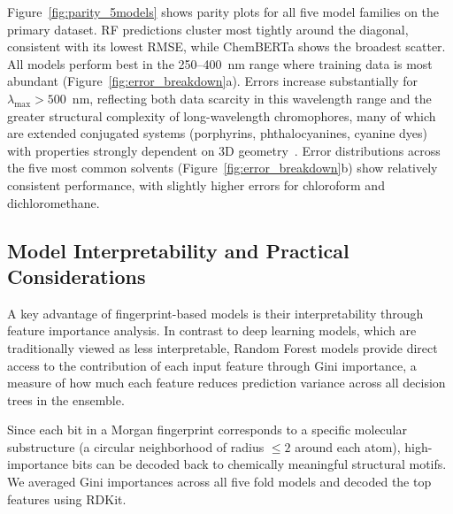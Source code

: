 \documentclass[11pt,a4paper]{article}
\begin{document}
Figure~\ref{fig:parity_5models} shows parity plots for all five model families on the primary dataset.
RF predictions cluster most tightly around the diagonal, consistent with its lowest RMSE, while ChemBERTa shows the broadest scatter.
All models perform best in the 250--400~nm range where training data is most abundant (Figure~\ref{fig:error_breakdown}a).
Errors increase substantially for $\lambda_{\max} > 500$~nm, reflecting both data scarcity in this wavelength range and the greater structural complexity of long-wavelength chromophores, many of which are extended conjugated systems (porphyrins, phthalocyanines, cyanine dyes) with properties strongly dependent on 3D geometry~\cite{flemingMolecular2010}.
Error distributions across the five most common solvents (Figure~\ref{fig:error_breakdown}b) show relatively consistent performance, with slightly higher errors for chloroform and dichloromethane.


\subsection{Model Interpretability and Practical Considerations}
\label{sec:interpretability}

A key advantage of fingerprint-based models is their interpretability through feature importance analysis.
In contrast to deep learning models, which are traditionally viewed as less interpretable, Random Forest models provide direct access to the contribution of each input feature through Gini importance, a measure of how much each feature reduces prediction variance across all decision trees in the ensemble.

Since each bit in a Morgan fingerprint corresponds to a specific molecular substructure (a circular neighborhood of radius $\leq 2$ around each atom), high-importance bits can be decoded back to chemically meaningful structural motifs.
We averaged Gini importances across all five fold models and decoded the top features using RDKit.
\end{document}
